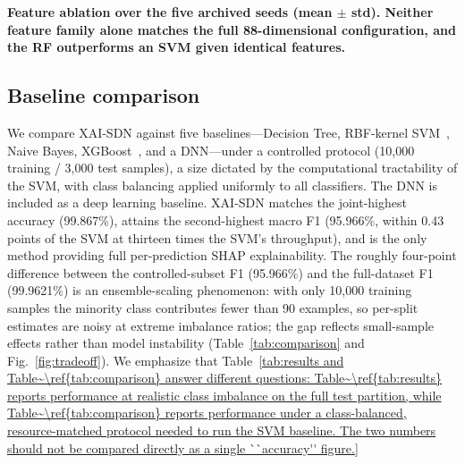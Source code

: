 \documentclass{ieeeaccess}
\begin{document}
{ \textbf{Feature ablation over the five archived seeds (mean $\pm$ std). Neither feature family alone matches the full 88-dimensional configuration, and the RF outperforms an SVM given identical features.}\label{fig:ablation}}

\subsection{Baseline comparison}
We compare XAI-SDN against five baselines---Decision Tree, RBF-kernel SVM~\cite{cortes1995svm}, Naive Bayes, XGBoost~\cite{chen2016xgboost}, and a DNN---under a controlled protocol (10,000 training / 3,000 test samples), a size dictated by the computational tractability of the SVM, with class balancing applied uniformly to all classifiers. The DNN is included as a deep learning baseline. XAI-SDN matches the joint-highest accuracy (99.867\%), attains the second-highest macro F1 (95.966\%, within 0.43 points of the SVM at thirteen times the SVM's throughput), and is the only method providing full per-prediction SHAP explainability. The roughly four-point difference between the controlled-subset F1 (95.966\%) and the full-dataset F1 (99.9621\%) is an ensemble-scaling phenomenon: with only 10,000 training samples the minority class contributes fewer than 90 examples, so per-split estimates are noisy at extreme imbalance ratios; the gap reflects small-sample effects rather than model instability (Table~\ref{tab:comparison} and Fig.~\ref{fig:tradeoff}). We emphasize that Table~\ref{tab:results and Table~\ref{tab:comparison} answer different questions: Table~\ref{tab:results} reports performance at realistic class imbalance on the full test partition, while Table~\ref{tab:comparison} reports performance under a class-balanced, resource-matched protocol needed to run the SVM baseline. The two numbers should not be compared directly as a single ``accuracy'' figure.}
\end{document}
